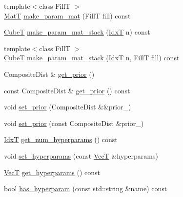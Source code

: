 \begin{DoxyCompactItemize}
\item 
{\footnotesize template$<$class FillT $>$ }\\\hyperlink{namespacemappel_a7091ab87c528041f7e2027195fad8915}{MatT} \hyperlink{classmappel_1_1PointEmitterModel_a68a9c537f2f2725eb8fb9d3e250dd84b}{make\+\_\+param\+\_\+mat} (FillT fill) const 
\item 
\hyperlink{namespacemappel_ab2afab4e6c8805e83946670d882768c2}{CubeT} \hyperlink{classmappel_1_1PointEmitterModel_a57b98d5f8b2b5ed2c455bbf76b632f87}{make\+\_\+param\+\_\+mat\+\_\+stack} (\hyperlink{namespacemappel_ab17ec0f30b61ece292439d7ece81d3a8}{IdxT} n) const 
\item 
{\footnotesize template$<$class FillT $>$ }\\\hyperlink{namespacemappel_ab2afab4e6c8805e83946670d882768c2}{CubeT} \hyperlink{classmappel_1_1PointEmitterModel_a2c11fa045187c7ea9ba382141b5d53c1}{make\+\_\+param\+\_\+mat\+\_\+stack} (\hyperlink{namespacemappel_ab17ec0f30b61ece292439d7ece81d3a8}{IdxT} n, FillT fill) const 
\item 
Composite\+Dist \& \hyperlink{classmappel_1_1PointEmitterModel_a2182c250c15d590b582e76594e5f06b9}{get\+\_\+prior} ()
\item 
const Composite\+Dist \& \hyperlink{classmappel_1_1PointEmitterModel_a239826b8e6b914c0cdaa293f1f5ddfd4}{get\+\_\+prior} () const 
\item 
void \hyperlink{classmappel_1_1PointEmitterModel_a8ee7d3d5b4c1ae4500f802170a958ed7}{set\+\_\+prior} (Composite\+Dist \&\&prior\+\_\+)
\item 
void \hyperlink{classmappel_1_1PointEmitterModel_acf37c5f28dc0c66197162b3408a6b815}{set\+\_\+prior} (const Composite\+Dist \&prior\+\_\+)
\item 
\hyperlink{namespacemappel_ab17ec0f30b61ece292439d7ece81d3a8}{IdxT} \hyperlink{classmappel_1_1PointEmitterModel_a442522cdaaa76be15b00a4f25110d7ec}{get\+\_\+num\+\_\+hyperparams} () const 
\item 
void \hyperlink{classmappel_1_1PointEmitterModel_ac603a33d83a32f5e4dd826399521a28b}{set\+\_\+hyperparams} (const \hyperlink{namespacemappel_a2225ad69f358daa3f4f99282a35b9a3a}{VecT} \&hyperparams)
\item 
\hyperlink{namespacemappel_a2225ad69f358daa3f4f99282a35b9a3a}{VecT} \hyperlink{classmappel_1_1PointEmitterModel_a4085ade54f4b039c647bc9bf7804e007}{get\+\_\+hyperparams} () const 
\item 
bool \hyperlink{classmappel_1_1PointEmitterModel_afba2b17a81a506b0acd41616c8604412}{has\+\_\+hyperparam} (const std\+::string \&name) const 

\end{DoxyCompactItemize}
